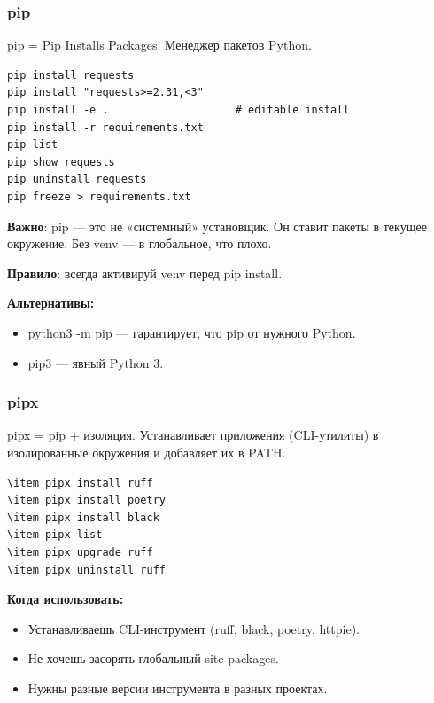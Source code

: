 \subsubsection{pip}

pip = Pip Installs Packages. Менеджер пакетов Python.

\begin{lstlisting}
pip install requests
pip install "requests>=2.31,<3"
pip install -e .                    # editable install
pip install -r requirements.txt
pip list
pip show requests
pip uninstall requests
pip freeze > requirements.txt
\end{lstlisting}

\begin{warningbox2}
\textbf{Важно}: pip — это не «системный» установщик. Он ставит пакеты в текущее окружение. Без venv — в глобальное, что плохо.
\end{warningbox2}

\textbf{Правило}: всегда активируй venv перед pip install.

\textbf{Альтернативы:}
\begin{itemize}
\item python3 -m pip — гарантирует, что pip от нужного Python.
\item pip3 — явный Python 3.
\end{itemize}

\subsubsection{pipx}
pipx = pip + изоляция. Устанавливает приложения (CLI-утилиты) в изолированные окружения и добавляет их в PATH.
\begin{lstlisting}
\item pipx install ruff
\item pipx install poetry
\item pipx install black
\item pipx list
\item pipx upgrade ruff
\item pipx uninstall ruff
\end{lstlisting}

\textbf{Когда использовать:}
\begin{itemize}
\item Устанавливаешь CLI-инструмент (ruff, black, poetry, httpie).
\item Не хочешь засорять глобальный site-packages.
\item Нужны разные версии инструмента в разных проектах.
\end {itemize}

